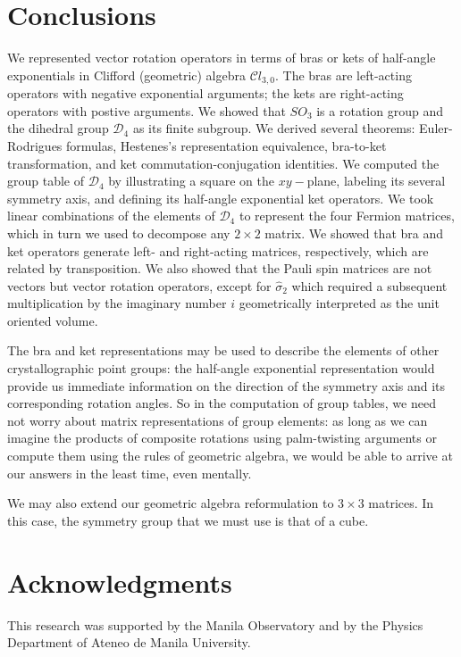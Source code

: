 \documentclass[11pt,twocolumn]{article}
\begin{document}
\section{Conclusions}

We represented vector rotation operators in terms of bras or kets of half-angle exponentials in Clifford (geometric) algebra $\mathcal Cl_{3,0}$.  The bras are left-acting operators with negative exponential arguments; the kets are right-acting operators with postive arguments.  We showed that $SO_3$ is a rotation group and the dihedral group $\mathcal D_4$ as its finite subgroup.  We derived several theorems: Euler-Rodrigues formulas, Hestenes's representation equivalence, bra-to-ket transformation, and ket commutation-conjugation identities. We computed the group table of $\mathcal D_4$ by illustrating a square on the $xy-$plane, labeling its several symmetry axis, and defining its half-angle exponential ket operators.  We took linear combinations of the elements of $\mathcal D_4$ to represent the four Fermion matrices, which in turn we used to decompose any $2\times 2$ matrix.  We showed that bra and ket operators generate left- and right-acting matrices, respectively, which are related by transposition.  We also showed that the Pauli spin matrices are not vectors but vector rotation operators, except for $\hat\sigma_2$ which required a subsequent multiplication by the imaginary number $i$ geometrically interpreted as the unit oriented volume.

The bra and ket representations may be used to describe the elements of other crystallographic point groups: the half-angle exponential representation would provide us immediate information on the direction of the symmetry axis and its corresponding rotation angles.  So in the computation of group tables, we need not worry about matrix representations of group elements: as long as we can imagine the products of composite rotations using palm-twisting arguments or compute them using the rules of geometric algebra, we would be able to arrive at our answers in the least time, even mentally.

We may also extend our geometric algebra reformulation to $3\times 3$ matrices.  In this case, the symmetry group that we must use is that of a cube.

\section*{\small{Acknowledgments}}
This research was supported by the Manila Observatory and by the Physics Department of Ateneo de Manila University.
\end{document}
